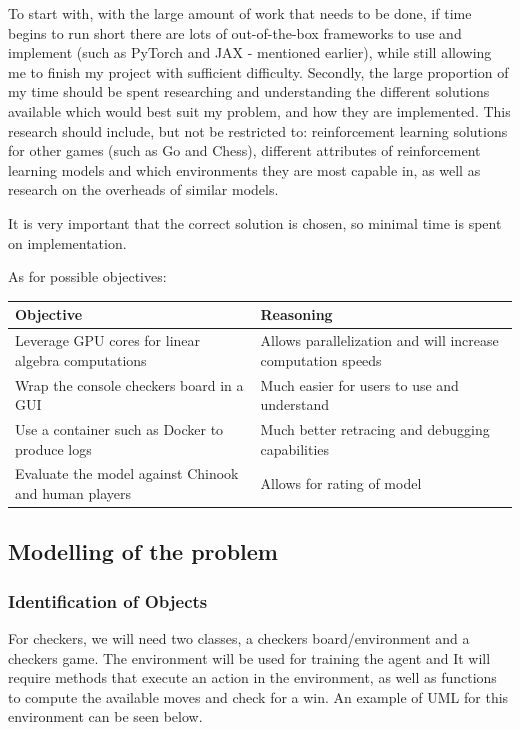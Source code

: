 \documentclass{article}
\makeatletter
\newcommand\subsubsubsection{\@startsection{paragraph}{4}{\z@}{-2.5ex\@plus -1ex \@minus -.25ex}{1.25ex \@plus .25ex}{\normalfont\normalsize\bfseries}}
\makeatother
\begin{document}
    To start with, with the large amount of work that needs to be done, if time begins to run short there are lots of out-of-the-box frameworks
    to use and implement (such as PyTorch and JAX - mentioned earlier), while still allowing me to finish my project with sufficient difficulty.
    Secondly, the large proportion of my time should be spent researching and understanding the different solutions available which would best
    suit my problem, and how they are implemented. This research should include, but not be restricted to: reinforcement learning solutions for
    other games (such as Go and Chess), different attributes of reinforcement learning models and which environments they are most capable in, as well
    as research on the overheads of similar models.

    It is very important that the correct solution is chosen, so minimal time is spent on implementation.

    As for possible objectives:
    \begin{center}
        \begin{tabular}{|m{15em}|m{15em}|}
            \hline 
            Objective & Reasoning \\
            \hline
            Leverage GPU cores for linear algebra computations & Allows parallelization and will increase computation speeds  \\      
            \hline
            Wrap the console checkers board in a GUI & Much easier for users to use and understand \\
            \hline
            Use a container such as Docker to produce logs & Much better retracing and debugging capabilities \\
            \hline
            Evaluate the model against Chinook and human players & Allows for rating of model \\
            \hline
        \end{tabular}
    \end{center}

    
    \subsection{Modelling of the problem}

    \subsubsection{Identification of Objects}

    \subsubsubsection{Checkers}
    For checkers, we will need two classes, a checkers board/environment and a checkers game. The environment will be used for training the agent and It will require methods that
    execute an action in the environment, as well as functions to compute the available moves and check for a win. An example of UML for this environment can be seen below. 
\end{document}
